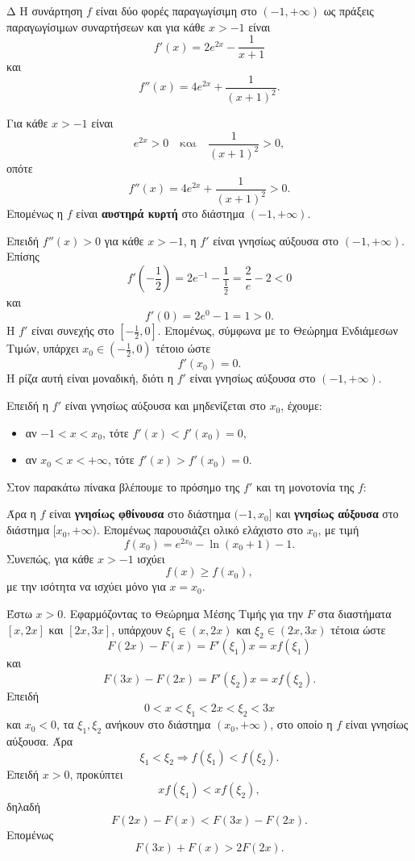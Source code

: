 \begin{thema}{Δ}
Η συνάρτηση $f$ είναι δύο φορές παραγωγίσιμη στο $(-1,+\infty)$ ως πράξεις παραγωγίσιμων συναρτήσεων και για κάθε $x>-1$ είναι
\[
f'(x)=2e^{2x}-\frac{1}{x+1}
\]
και
\[
f''(x)=4e^{2x}+\frac{1}{(x+1)^2}.
\]
\begin{erwthma}
\item Για κάθε $x>-1$ είναι
\[
e^{2x}>0
\quad\text{και}\quad
\frac{1}{(x+1)^2}>0,
\]
οπότε
\[
f''(x)=4e^{2x}+\frac{1}{(x+1)^2}>0.
\]
Επομένως η $f$ είναι \textbf{αυστηρά κυρτή} στο διάστημα $(-1,+\infty)$.

\item Επειδή $f''(x)>0$ για κάθε $x>-1$, η $f'$ είναι γνησίως αύξουσα στο $(-1,+\infty)$. Επίσης
\[
f'\left(-\frac{1}{2}\right)
=2e^{-1}-\frac{1}{\frac{1}{2}}
=\frac{2}{e}-2<0
\]
και
\[
f'(0)=2e^0-1=1>0.
\]
Η $f'$ είναι συνεχής στο $\left[-\frac{1}{2},0\right]$. Επομένως, σύμφωνα με το Θεώρημα Ενδιάμεσων Τιμών, υπάρχει $x_0\in\left(-\frac{1}{2},0\right)$ τέτοιο ώστε
\[
f'(x_0)=0.
\]
Η ρίζα αυτή είναι μοναδική, διότι η $f'$ είναι γνησίως αύξουσα στο $(-1,+\infty)$.

\item Επειδή η $f'$ είναι γνησίως αύξουσα και μηδενίζεται στο $x_0$, έχουμε:
\begin{itemize}
\item αν $-1<x<x_0$, τότε $f'(x)<f'(x_0)=0$,
\item αν $x_0<x<+\infty$, τότε $f'(x)>f'(x_0)=0$.
\end{itemize}
Στον παρακάτω πίνακα βλέπουμε το πρόσημο της $f'$ και τη μονοτονία της $f$:
\begin{center}
\end{center}

Άρα η $f$ είναι \textbf{γνησίως φθίνουσα} στο διάστημα $(-1,x_0]$ και \textbf{γνησίως αύξουσα} στο διάστημα $[x_0,+\infty)$. Επομένως παρουσιάζει ολικό ελάχιστο στο $x_0$, με τιμή
\[
f(x_0)=e^{2x_0}-\ln(x_0+1)-1.
\]
Συνεπώς, για κάθε $x>-1$ ισχύει
\[
{f(x)\geq f(x_0)},
\]
με την ισότητα να ισχύει μόνο για $x=x_0$.

\item Έστω $x>0$. Εφαρμόζοντας το Θεώρημα Μέσης Τιμής για την $F$ στα διαστήματα $[x,2x]$ και $[2x,3x]$, υπάρχουν $\xi_1\in(x,2x)$ και $\xi_2\in(2x,3x)$ τέτοια ώστε
\[
F(2x)-F(x)=F'(\xi_1)x=xf(\xi_1)
\]
και
\[
F(3x)-F(2x)=F'(\xi_2)x=xf(\xi_2).
\]
Επειδή
\[
0<x<\xi_1<2x<\xi_2<3x
\]
και $x_0<0$, τα $\xi_1,\xi_2$ ανήκουν στο διάστημα $(x_0,+\infty)$, στο οποίο η $f$ είναι γνησίως αύξουσα. Άρα
\[
\xi_1<\xi_2\Rightarrow f(\xi_1)<f(\xi_2).
\]
Επειδή $x>0$, προκύπτει
\[
xf(\xi_1)<xf(\xi_2),
\]
δηλαδή
\[
F(2x)-F(x)<F(3x)-F(2x).
\]
Επομένως
\[
{F(3x)+F(x)>2F(2x)}.
\]
\end{erwthma}
\end{thema}

